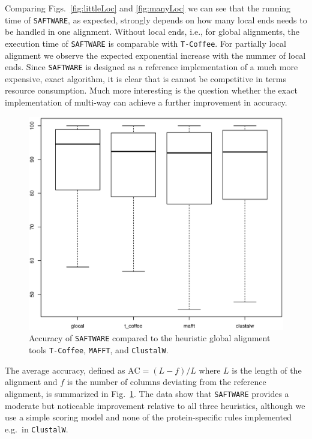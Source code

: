 \documentclass[a4paper,10pt]{article}
\newcommand{\TODO}[1]{\begingroup\color{red}#1\endgroup}
\newcommand{\PFS}[1]{\begingroup\color{green}#1\endgroup}
\newcommand{\SAFTWARE}{\TODO{\texttt{SAFTWARE}}}
\begin{document}
Comparing Figs.~\ref{fig:littleLoc} and \ref{fig:manyLoc} we can see that
the running time of \SAFTWARE, as expected, strongly depends on how many
local ends needs to be handled in one alignment. \PFS{Without local ends,
  i.e., for global alignments, the execution time of \SAFTWARE{} is
  comparable with \texttt{T-Coffee}. For partially local alignment we
  observe the expected exponential increase with the nummer of local
  ends. Since \SAFTWARE{} is designed as a reference implementation of a
  much more expensive, exact algorithm, it is clear that is cannot be
  competitive in terms resource consumption. Much more interesting is the
  question whether the exact implementation of multi-way can achieve a
  further improvement in accuracy.}

\begin{figure}
  \begin{center}
    \includegraphics[width=1\columnwidth]{ac.eps}
  \end{center}
  \caption{Accuracy of \SAFTWARE{} compared to the heuristic global
    alignment tools \texttt{T-Coffee}, \texttt{MAFFT}, and
    \texttt{ClustalW}.}
    \label{fig:ac}
\end{figure}

\PFS{The average accuracy, defined as $\mbox{AC}=(L-f)/L$ where $L$ is the
  length of the alignment and $f$ is the number of columns deviating from
  the reference alignment, is summarized in Fig.~\ref{fig:ac}. The data
  show that \SAFTWARE{} provides a moderate but noticeable improvement
  relative to all three heuristics, although we use a simple scoring model
  and none of the protein-specific rules implemented e.g.\ in
  \texttt{ClustalW}. }
\end{document}
